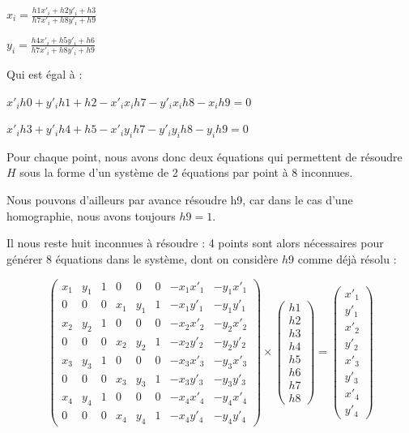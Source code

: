     $x_i = \frac{h1x'_i + h2y'_i + h3}{h7x'_i + h8y'_i + h9} $

    $y_i = \frac{h4x'_i + h5y'_i + h6}{h7x'_i + h8y'_i + h9} $

    Qui est égal à :

    $ x'_ih0 + y'_ih1 + h2 - x'_i x_ih7 - y'_ix_ih8 - x_ih9 = 0 $

    $ x'_ih3 + y'_ih4 + h5 - x'_iy_ih7 - y'_iy_ih8 - y_ih9 = 0 $

    Pour chaque point, nous avons donc deux équations qui permettent de résoudre $H$ sous la forme d'un système de 2 équations par point à 8 inconnues.

    Nous pouvons d'ailleurs par avance résoudre h9, car dans le cas d'une homographie, nous avons toujours $h9 = 1$.

    Il nous reste huit inconnues à résoudre : 4 points sont alors nécessaires pour générer 8 équations dans le système, dont on considère $h9$ comme déjà résolu : 

    \[
      \begin{pmatrix} 
        x_1 & y_1 & 1 & 0 & 0 & 0 & -x_1 x'_1 & -y_1 x'_1 \\ 
        0 & 0 & 0 & x_1 & y_1 & 1 & -x_1 y'_1 & -y_1 y'_1 \\

        x_2 & y_2 & 1 & 0 & 0 & 0 & -x_2 x'_2 & -y_2 x'_2 \\ 
        0 & 0 & 0 & x_2 & y_2 & 1 & -x_2 y'_2 & -y_2 y'_2 \\

        x_3 & y_3 & 1 & 0 & 0 & 0 & -x_3 x'_3 & -y_3 x'_3 \\ 
        0 & 0 & 0 & x_3 & y_3 & 1 & -x_3 y'_3 & -y_3 y'_3 \\

        x_4 & y_4 & 1 & 0 & 0 & 0 & -x_4 x'_4 & -y_4 x'_4 \\ 
        0 & 0 & 0 & x_4 & y_4 & 1 & -x_4 y'_4 & -y_4 y'_4
    \end{pmatrix} 
    \times
    \begin{pmatrix} h1 \\ h2 \\ h3 \\ h4 \\ h5 \\h6 \\ h7 \\ h8 \end{pmatrix}
    =
    \begin{pmatrix} x'_1 \\ y'_1 \\ x'_2 \\ y'_2 \\ x'_3 \\ y'_3 \\ x'_4 \\ y'_4 \end{pmatrix} 
    \]

